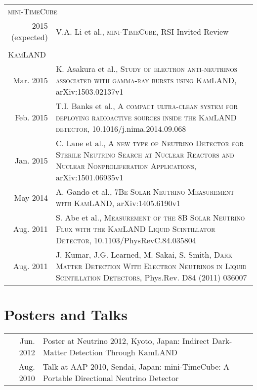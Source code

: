\documentclass[a4paper,10pt]{article} %
\begin{document}
\begin{tabular}{rp{11cm}}
	\multicolumn{2}{l}{\textsc{mini-TimeCube}} \\
	2015 (expected) & V.A. Li et al., \textsc{mini-TimeCube}, RSI Invited Review\\
	\multicolumn{2}{c}{} \\
	\multicolumn{2}{l}{\textsc{KamLAND}} \\
	Mar. 2015 & K. Asakura et al., \textsc{Study of electron anti-neutrinos
	associated with gamma-ray bursts using KamLAND}, arXiv:1503.02137v1\\
	Feb. 2015 & T.I. Banks et al., \textsc{A compact ultra-clean system for
	deploying radioactive sources inside the KamLAND detector},
	10.1016/j.nima.2014.09.068\\
	Jan. 2015 & C. Lane et al., \textsc{A new type of Neutrino Detector for
	Sterile Neutrino Search at Nuclear Reactors and Nuclear Nonproliferation
	Applications}, arXiv:1501.06935v1\\
	May 2014 & A. Gando et al., \textsc{7Be Solar Neutrino Measurement with
	KamLAND}, arXiv:1405.6190v1\\
	Aug. 2011 & S. Abe et al., \textsc{Measurement of the 8B Solar Neutrino
	Flux with the KamLAND Liquid Scintillator Detector},
	10.1103/PhysRevC.84.035804\\
	Aug. 2011 & J. Kumar, J.G. Learned, M. Sakai, S. Smith,
	\textsc{Dark Matter Detection With Electron Neutrinos in Liquid
	Scintillation Detectors}, Phys.Rev. D84 (2011) 036007\\
\end{tabular}


\section{Posters and Talks}
\begin{tabular}{rp{11cm}}
	Jun. 2012 & Poster at Neutrino 2012, Kyoto, Japan: Indirect Dark-Matter
	Detection Through KamLAND\\
	Aug. 2010 & Talk at AAP 2010, Sendai, Japan: mini-TimeCube: A Portable
	Directional Neutrino Detector\\
\end{tabular}

\end{document}
